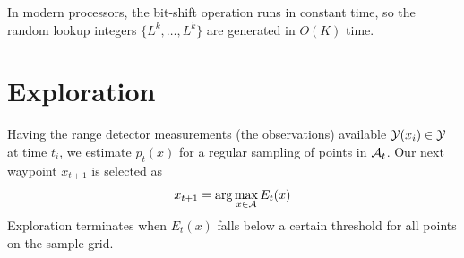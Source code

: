 In modern processors, the bit-shift operation runs in constant time, so
the random lookup integers $\{L^k, \ldots, L^k\}$ are generated in $O(K)$ time.

\section{Exploration}

Having the range detector measurements (the observations) available $\mathcal{Y}(x_i) \in \mathcal{Y}$ at time $t_i$, we 
estimate $p_t(x)$ for a regular sampling of points in $\mathcal{A}_t$.  Our next waypoint $x_{t+1}$ is selected as
\begin{equation}
 x_{t+1} = \arg\max_{x\in\mathcal{A}} E_t(x)
\end{equation}
Exploration terminates when $E_t(x)$ falls below a certain threshold for all points on the sample grid.

